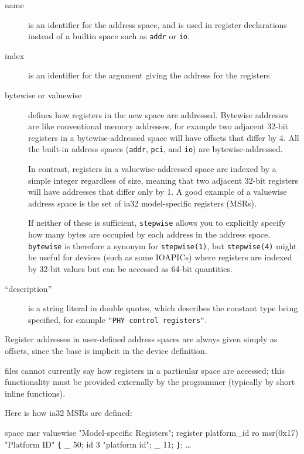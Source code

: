 \documentclass[a4paper,11pt,twoside]{report}
\begin{document}
\begin{description}
\item[name] is an identifier for the address space, and is used in
  register declarations instead of a builtin space such as
  \texttt{addr} or \texttt{io}. 

\item [index] is an identifier for the argument giving the address for
  the registers

\item [bytewise or valuewise] defines how registers in the new
  space are addressed.  Bytewise addresses are like conventional
  memory addresses, for example two adjacent 32-bit registers in a
  bytewise-addressed space will have offsets that differ by 4.  All
  the built-in address spaces (\texttt{addr}, \texttt{pci}, and
  \texttt{io}) are bytewise-addressed. 

  In contrast, registers in a valuewise-addressed space are indexed by
  a simple integer regardless of size, meaning that two adjacent
  32-bit registers will have addresses that differ only by 1.
  A good example of a valuewise address space is the set of ia32
  model-specific registers (MSRs). 

  If neither of these is sufficient, \texttt{stepwise} allows you to
  explicitly specify how many bytes are occupied by each address in
  the address space.  \texttt{bytewise} is therefore a synonym for
  \texttt{stepwise(1)}, but \texttt{stepwise(4)} might be useful for
  devices (such as some IOAPICs) where registers are indexed by 32-bit
  values but can be accessed as 64-bit quantities. 

\item [``description''] is a string literal in double quotes, which
  describes the constant type being specified, for example
  \texttt{"PHY control registers"}. 

\end{description}

Register addresses in user-defined address spaces are always given
simply as offsets, since the base is implicit in the device
definition.  

\Mac files cannot currently say how registers in a particular space
are accessed; this functionality must be provided externally by the
programmer (typically by short inline functions).  

Here is how ia32 MSRs are defined: 

\begin{example}
space msr valuewise "Model-specific Registers";
register platform\_id ro msr(0x17) "Platform ID" \verb+{+
    \_	50;
    id	3 "platform id";
    \_	11;
\verb+}+;
\ldots
\end{example}
\end{document}
